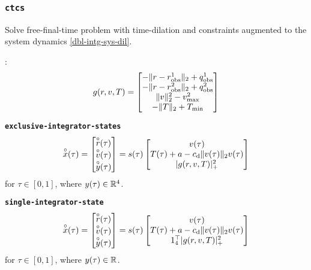 \documentclass[11pt,a4paper]{article}
\begin{document}
\subsubsection{\texttt{ctcs}}

Solve free-final-time problem with time-dilation and constraints augmented to the system dynamics \eqref{dbl-intg-sys-dil}.

:
\begin{align*}
    g(r,v,T) = \begin{bmatrix}
                  -\|r - r^1_{\mathrm{obs}}\|_2 + q^1_{\mathrm{obs}} \\
                  -\|r - r^2_{\mathrm{obs}}\|_2 + q^2_{\mathrm{obs}} \\
                   \|v\|_2^2 - v_{\max}^2 \\
                  -\|T\|_2 + T_{\min}
               \end{bmatrix}
\end{align*}


\textbf{\texttt{exclusive-integrator-states}}
\begin{align}
    \overset{\circ}{x}(\tau) = \begin{bmatrix}
                        \overset{\circ}{r}(\tau) \\
                        \overset{\circ}{v}(\tau) \\
                        \overset{\circ}{y}(\tau) 
                     \end{bmatrix} = s(\tau)\begin{bmatrix}
                                        v(\tau) \\
                                        T(\tau) + a - c_{\mathrm{d}}\|v(\tau)\|_2v(\tau) \\
                                        |g(r,v,T)|_+^2
                                     \end{bmatrix}\label{dbl-intg-dilaugsys-exclu}
\end{align}
for $\tau\in[0,1]$, where $y(\tau)\in\mathbb{R}^{4}$.

\textbf{\texttt{single-integrator-state}}
\begin{align}
    \overset{\circ}{x}(\tau) = \begin{bmatrix}
                        \overset{\circ}{r}(\tau) \\
                        \overset{\circ}{v}(\tau) \\
                        \overset{\circ}{y}(\tau) 
                     \end{bmatrix} = s(\tau)\begin{bmatrix}
                                        v(\tau) \\
                                        T(\tau) + a - c_{\mathrm{d}}\|v(\tau)\|_2v(\tau) \\
                                        1_4^\top|g(r,v,T)|_+^2
                                     \end{bmatrix}\label{dbl-intg-dilaugsys-single}
\end{align}
for $\tau\in[0,1]$, where $y(\tau)\in\mathbb{R}^{}$.
\end{document}
